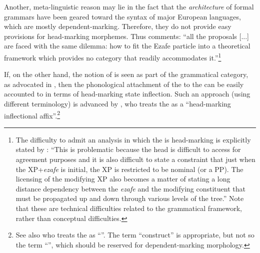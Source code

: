 Another, meta-linguistic reason may lie in the fact that the \textit{architecture} of formal grammars have been geared toward the syntax of major European languages, which are mostly dependent-marking. Therefore, they do not provide easy provisions for head-marking morphemes. Thus \citet{HaigLinker} comments: \enquote{all the proposals [...] are faced with the same dilemma: how to fit the Ezafe particle into a theoretical framework which provides no category that readily accommodates it.}\footnote{The difficulty to admit an analysis in which the \ez* is head-marking is explicitly stated by \citet[317]{BögelButt}: \enquote{This is problematic because the head is difficult to access for agreement purposes and it is also difficult to state a constraint that just when the XP+\textit{ezafe} is initial, the XP is restricted to be nominal (or a PP). The licensing of the modifying XP also becomes a matter of stating a long distance dependency between the \textit{ezafe} and the modifying constituent that must be propagated up and down through various levels of the tree.} Note that these are technical difficulties related to the grammatical framework, rather than conceptual difficulties.}

If, on the other hand, the notion of  is seen as part of the  grammatical category, as advocated in , then the phonological attachment of the \ez* to the \prim can be
 easily accounted to in terms of head-marking state inflection.  Such an approach (using different terminology) is advanced by \citet{SamvelianEzafe, SamvelianHead}, who treats the \ez* as a \enquote{head-marking inflectional affix}.\footnote{See also \citet[11--17]{ThackstonKurmanji} who treats the \Kur \ez* as \enquote{}. The term \enquote{construct} is appropriate, but not so the term \enquote{}, which should be reserved for dependent-marking morphology.}

